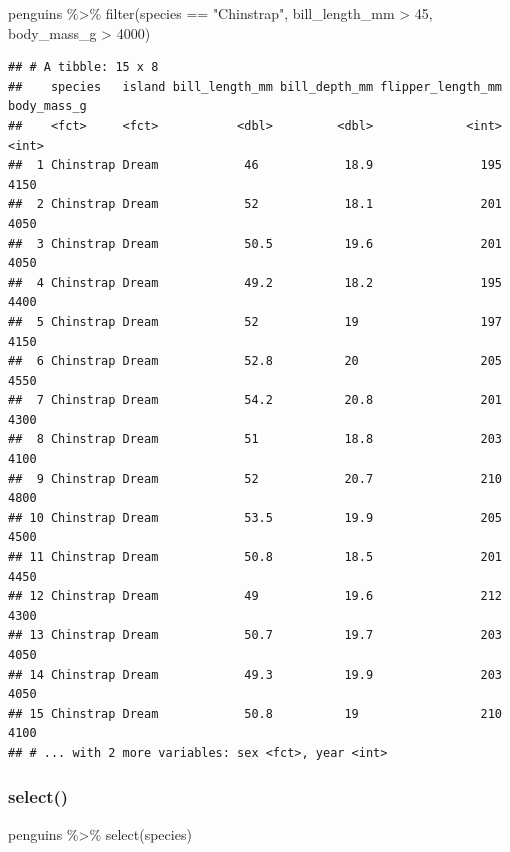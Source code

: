 \documentclass[
]{article}
\newenvironment{Shaded}{\begin{snugshade}}{\end{snugshade}}
\newcommand{\DecValTok}[1]{\textcolor[rgb]{0.00,0.00,0.81}{#1}}
\newcommand{\FunctionTok}[1]{\textcolor[rgb]{0.00,0.00,0.00}{#1}}
\newcommand{\NormalTok}[1]{#1}
\newcommand{\SpecialCharTok}[1]{\textcolor[rgb]{0.00,0.00,0.00}{#1}}
\newcommand{\StringTok}[1]{\textcolor[rgb]{0.31,0.60,0.02}{#1}}
\begin{document}
\begin{Shaded}
\begin{Highlighting}[]
\NormalTok{penguins }\SpecialCharTok{\%\textgreater{}\%} 
  \FunctionTok{filter}\NormalTok{(species }\SpecialCharTok{==} \StringTok{"Chinstrap"}\NormalTok{, }
\NormalTok{         bill\_length\_mm }\SpecialCharTok{\textgreater{}} \DecValTok{45}\NormalTok{, }
\NormalTok{         body\_mass\_g }\SpecialCharTok{\textgreater{}} \DecValTok{4000}\NormalTok{) }
\end{Highlighting}
\end{Shaded}

\begin{verbatim}
## # A tibble: 15 x 8
##    species   island bill_length_mm bill_depth_mm flipper_length_mm body_mass_g
##    <fct>     <fct>           <dbl>         <dbl>             <int>       <int>
##  1 Chinstrap Dream            46            18.9               195        4150
##  2 Chinstrap Dream            52            18.1               201        4050
##  3 Chinstrap Dream            50.5          19.6               201        4050
##  4 Chinstrap Dream            49.2          18.2               195        4400
##  5 Chinstrap Dream            52            19                 197        4150
##  6 Chinstrap Dream            52.8          20                 205        4550
##  7 Chinstrap Dream            54.2          20.8               201        4300
##  8 Chinstrap Dream            51            18.8               203        4100
##  9 Chinstrap Dream            52            20.7               210        4800
## 10 Chinstrap Dream            53.5          19.9               205        4500
## 11 Chinstrap Dream            50.8          18.5               201        4450
## 12 Chinstrap Dream            49            19.6               212        4300
## 13 Chinstrap Dream            50.7          19.7               203        4050
## 14 Chinstrap Dream            49.3          19.9               203        4050
## 15 Chinstrap Dream            50.8          19                 210        4100
## # ... with 2 more variables: sex <fct>, year <int>
\end{verbatim}

\hypertarget{select}{%
\subsubsection{select()}\label{select}}

\begin{Shaded}
\begin{Highlighting}[]
\NormalTok{penguins }\SpecialCharTok{\%\textgreater{}\%} 
  \FunctionTok{select}\NormalTok{(species)}
\end{Highlighting}
\end{Shaded}
\end{document}
